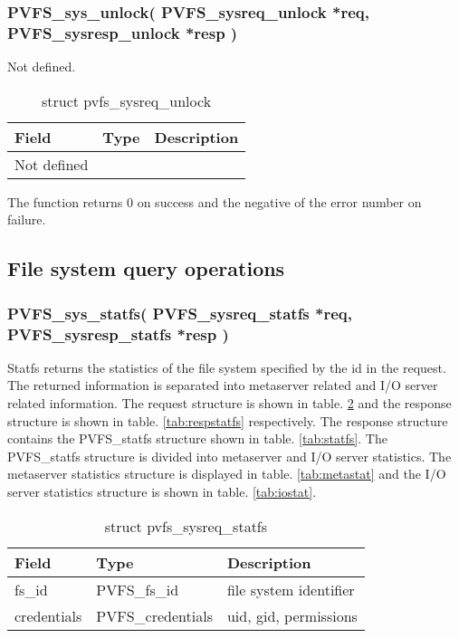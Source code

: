 \documentclass[11pt, letterpaper]{article}
\begin{document}
\subsubsection{PVFS\_sys\_unlock(
PVFS\_sysreq\_unlock *req,
PVFS\_sysresp\_unlock *resp
)}

Not defined.

\begin{table}[H]
\begin{tabular}{|l|l|l|}
\hline
Field & Type & Description \\
\hline
\hline
Not defined & & \\
\hline
\end{tabular}
\caption{struct pvfs\_sysreq\_unlock}\label{tab:requnlock}
\end{table}

The function returns 0 on success and the negative of the error
number on failure.

\subsection{File system query operations}

\subsubsection{PVFS\_sys\_statfs(
PVFS\_sysreq\_statfs *req,
PVFS\_sysresp\_statfs *resp
)}

Statfs returns the statistics of the file system specified by the id in
the request. The returned information is separated into metaserver related
and I/O server related information. The request structure is shown in
table. \ref{tab:reqstatfs} and the response structure is shown in table.
\ref{tab:respstatfs} respectively. The response structure contains the
PVFS\_statfs structure shown in table. \ref{tab:statfs}. The PVFS\_statfs
structure is divided into metaserver and I/O server statistics. The
metaserver statistics structure is displayed in table. \ref{tab:metastat}
and the I/O server statistics structure is shown in table. \ref{tab:iostat}.

\begin{table}[H]
\begin{tabular}{|l|l|l|}
\hline
Field & Type & Description \\
\hline
\hline
fs\_id & PVFS\_fs\_id & file system identifier \\
\hline
credentials & PVFS\_credentials & uid, gid, permissions \\
\hline
\end{tabular}
\caption{struct pvfs\_sysreq\_statfs}\label{tab:reqstatfs}
\end{table}
\end{document}
